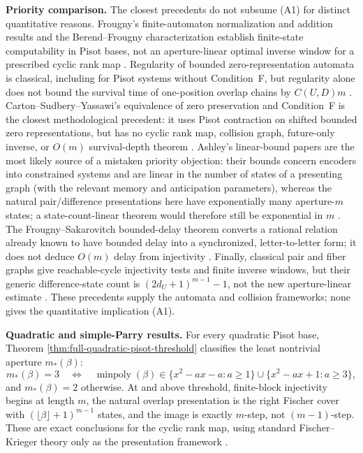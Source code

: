 \medskip
\noindent\textbf{Priority comparison.}
The closest precedents do not subsume \textup{(A1)} for distinct quantitative
reasons.  Frougny's finite-automaton normalization and addition results and
the Berend--Frougny characterization establish finite-state computability in
Pisot bases, not an aperture-linear optimal inverse window for a prescribed
cyclic rank map \cite{Frougny1992,BerendFrougny1994}.  Regularity of bounded
zero-representation automata is classical, including for Pisot systems
without Condition~F, but regularity alone does not bound the survival time of
one-position overlap chains by $C(U,D)m$
\cite{Frougny1992,CartonSudberyYassawi2026}.  Carton--Sudbery--Yassawi's
equivalence of zero preservation and Condition~F is the closest
methodological precedent: it uses Pisot contraction on shifted bounded zero
representations, but has no cyclic rank map, collision graph, future-only
inverse, or $O(m)$ survival-depth theorem
\cite{CartonSudberyYassawi2026}.  Ashley's linear-bound papers are the most
likely source of a mistaken priority objection: their bounds concern
encoders into constrained systems and are linear in the number of states of
a presenting graph (with the relevant memory and anticipation parameters),
whereas the natural pair/difference presentations here have exponentially
many aperture-$m$ states; a state-count-linear theorem would therefore still
be exponential in $m$ \cite{Ashley1988,Ashley1996}.  The
Frougny--Sakarovitch bounded-delay theorem converts a rational relation already
known to have bounded delay into a synchronized, letter-to-letter form; it
does not deduce $O(m)$ delay from injectivity
\cite{FrougnySakarovitch1991}.  Finally, classical pair and fiber graphs give
reachable-cycle injectivity tests and finite inverse windows, but their
generic difference-state count is $(2d_U+1)^{m-1}-1$, not the new
aperture-linear estimate
\cite{AmorosoPatt1972,Richardson1972,Nasu1977,Head1989,LindMarcus1995,
Nasu1995}.  These precedents supply the automata and collision frameworks;
none gives the quantitative implication \textup{(A1)}.

\medskip
\noindent\textbf{Quadratic and simple-Parry results.}
For every quadratic Pisot base, Theorem
\ref{thm:full-quadratic-pisot-threshold} classifies the least nontrivial
aperture $m_*(\beta)$:
\[
m_*(\beta)=3
\quad\Longleftrightarrow\quad
\operatorname{minpoly}(\beta)\in
\{x^2-ax-a:a\ge1\}\cup\{x^2-ax+1:a\ge3\},
\]
and $m_*(\beta)=2$ otherwise.  At and above threshold, finite-block
injectivity begins at length $m$, the natural overlap presentation is the
right Fischer cover with $(\lfloor\beta\rfloor+1)^{m-1}$ states, and the
image is exactly $m$-step, not $(m-1)$-step.  These are exact conclusions for
the cyclic rank map, using standard Fischer--Krieger theory only as the
presentation framework \cite{Fischer1975,Krieger1984,LindMarcus1995}.


